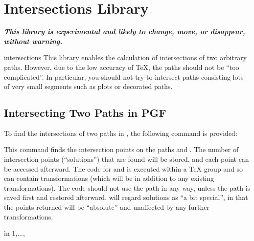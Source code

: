 %
%
%


\section{Intersections Library}

{\bf\emph{This library is experimental and likely to change,
move, or disappear, without warning.}}

\begin{pgflibrary}{intersections}
  This library enables the calculation of intersections of
  two arbitrary paths. However, due to the low accuracy of
  \TeX, the paths should not be ``too complicated''.
  In particular, you should not try to intersect paths consisting 
  lots of very small segments such as plots or decorated paths.
\end{pgflibrary}

\subsection{Intersecting Two Paths in PGF}
  
  To find the intersections of two paths in \pgfname, the following 
  command is provided:
   
\begin{command}{\pgfintersectionofpaths{}}
  This command finds the intersection points on the paths 
   and . The number of intersection points
  (``solutions'') that are found will be stored, and each point 
  can be accessed afterward. The code for  and 
   is executed within a \TeX{} group and so can contain
  transformations (which will be in addition to any existing
  transformations). The code should not use the path in any way, 
  unless the path is saved first and restored afterward.
  \pgfname{} will regard solutions as ``a bit
  special'', in that the points returned  will be ``absolute'' and 
  unaffected by any further transformations.

\begin{codeexample}[]
\begin{pgfpicture}
\pgfintersectionofpaths
{
  \pgfgetpath\temppath
  \pgfsetpath\temppath
}
{
  \pgfgetpath\temppath
  \pgfsetpath\temppath
}
\foreach \s in {1,...,\pgfintersectionsolutions}
  {\pgfpathcircle{\pgfpointintersectionsolution{\s}}{2pt}}
\end{pgfpicture}
\end{codeexample}

\end{command}

